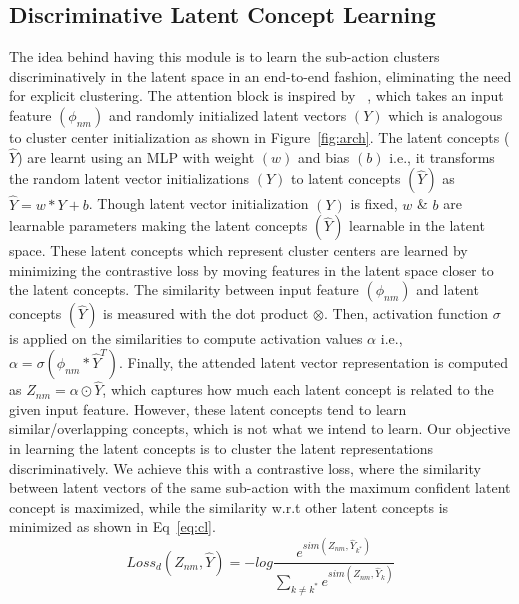 \documentclass[final]{cvpr}
\begin{document}
\subsection{Discriminative Latent Concept Learning}
\label{sec:dislc}
\par The idea behind having this module is to learn the sub-action clusters discriminatively in the latent space in an end-to-end fashion, eliminating the need for explicit clustering. 
The attention block is inspired by ~\cite{hussein2019videograph}, which  takes an input feature $(\phi_{nm})$ and randomly initialized latent vectors $(Y)$ which is analogous to cluster center initialization as shown in Figure~\ref{fig:arch}. The latent concepts ($\widehat{Y}$) are learnt using an MLP with weight $(w)$ and bias $(b)$ i.e., it transforms the random latent vector initializations $(Y)$ to latent concepts $(\widehat{Y})$  as $\widehat{Y} = w * Y + b$. Though latent vector initialization $(Y)$ is fixed, $w$ \& $b$ are learnable parameters making the latent concepts $(\widehat{Y})$ learnable in the latent space.  These latent concepts which represent cluster centers are learned by minimizing the contrastive loss by moving features in the latent space closer to the latent concepts. The similarity  between input feature $(\phi_{nm})$ and latent concepts $(\widehat{Y})$ is measured with the dot product $\otimes$.  Then, activation function $\sigma$ is applied on the similarities to compute activation values $\alpha$ i.e., $ \alpha = \sigma(\phi_{nm} * \widehat{Y}^{T})$. Finally, the attended latent vector representation is computed as $Z_{nm} = \alpha \odot \widehat{Y}$, which captures how much each latent concept is related to the given input feature. 
However, these latent concepts tend to learn similar/overlapping concepts, which is not what we intend to learn.
Our objective in learning the latent concepts is to cluster the latent representations discriminatively. We achieve this with a contrastive loss, where the similarity between latent vectors of the same sub-action with the maximum confident latent concept is maximized, while the similarity w.r.t other latent concepts is minimized as shown in Eq~\ref{eq:cl}.
\vspace{-0.4cm}
\begin{equation}
    Loss_{d}(Z_{nm}, \widehat{Y}) = -log \frac{e^{sim(Z_{nm}, \widehat{Y}_{k^{*}})}}{\sum_{k \neq k^{*}} e^{sim(Z_{nm}, \widehat{Y}_{k})}} \label{eq:cl} %
\end{equation}
\vspace{-0.3cm}
\end{document}
